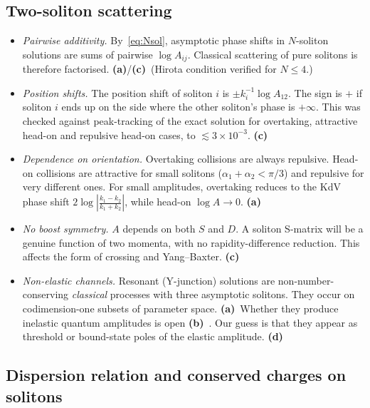 \documentclass[11pt,a4paper]{article}
\newcommand{\La}{\textsf{\textbf{(a)}}}
\newcommand{\Lb}{\textsf{\textbf{(b)}}}
\newcommand{\Lc}{\textsf{\textbf{(c)}}}
\newcommand{\Ld}{\textsf{\textbf{(d)}}}
\theoremstyle{remark}
\begin{document}
\subsection{Two-soliton scattering}

\begin{itemize}
\item \emph{Pairwise additivity.} By~\eqref{eq:Nsol}, asymptotic phase shifts in $N$-soliton solutions are sums of pairwise $\log A_{ij}$. Classical scattering of pure solitons is therefore factorised. \La/\Lc\ (Hirota condition verified for $N\le4$.)
\item \emph{Position shifts.} The position shift of soliton $i$ is $\pm k_i^{-1}\log A_{12}$. The sign is $+$ if soliton $i$ ends up on the side where the other soliton's phase is $+\infty$. This was checked against peak-tracking of the exact solution for overtaking, attractive head-on and repulsive head-on cases, to $\lesssim3\times10^{-3}$. \Lc
\item \emph{Dependence on orientation.} Overtaking collisions are always repulsive. Head-on collisions are attractive for small solitons ($\alpha_1+\alpha_2<\pi/3$) and repulsive for very different ones. For small amplitudes, overtaking reduces to the KdV phase shift $2\log|\frac{k_1-k_2}{k_1+k_2}|$, while head-on $\log A\to0$. \La~\cite{BD}
\item \emph{No boost symmetry.} $A$ depends on both $S$ and $D$. A soliton S-matrix will be a genuine function of two momenta, with no rapidity-difference reduction. This affects the form of crossing and Yang--Baxter. \Lc
\item \emph{Non-elastic channels.} Resonant (Y-junction) solutions are non-number-conserving \emph{classical} processes with three asymptotic solitons. They occur on codimension-one subsets of parameter space. \La\ Whether they produce inelastic quantum amplitudes is open \Lb~\cite{CZ}. Our guess is that they appear as threshold or bound-state poles of the elastic amplitude. \Ld
\end{itemize}

\subsection{Dispersion relation and conserved charges on solitons}
\end{document}
